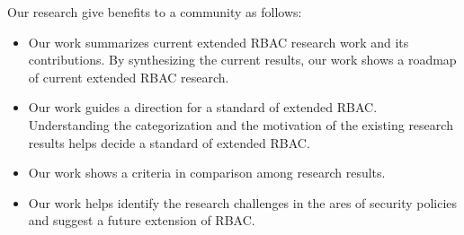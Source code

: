 Our research give benefits to a community as follows:
\begin{itemize}
	\item Our work summarizes current extended RBAC research work and its contributions. By synthesizing the current results, our work shows a roadmap of current extended RBAC research.	
	\item Our work guides a direction for a standard of extended RBAC. Understanding the categorization and the motivation of the existing
	research results helps decide a standard of extended RBAC.
	\item Our work shows a criteria in comparison among research results.
	\item Our work helps identify the research challenges in the ares of security policies and suggest a future extension of RBAC.			
\end{itemize}













%
%
%






%
%
%
